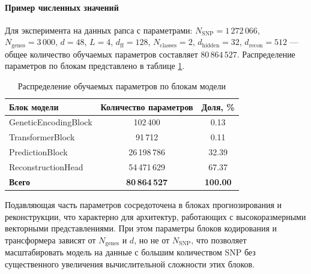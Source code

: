 \paragraph{Пример численных значений}

Для эксперимента на данных рапса с параметрами: $N_{\text{SNP}} = 1\,272\,066$, 
$N_{\text{genes}} = 3\,000$, $d = 48$, $L = 4$, $d_{\text{ff}} = 128$, 
$N_{\text{classes}} = 2$, $d_{\text{hidden}} = 32$, $d_{\text{recon}} = 512$ ---
общее количество обучаемых параметров составляет $80\,864\,527$. 
Распределение параметров по блокам представлено в таблице \ref{tab:params_distribution}.

\begin{table}[h!]
	\centering
	\caption{Распределение обучаемых параметров по блокам модели}
	\label{tab:params_distribution}
	\begin{tabular}{|l|c|c|}
		\hline
		\textbf{Блок модели} & \textbf{Количество параметров} & \textbf{Доля, \%} \\ \hline
		GeneticEncodingBlock & 102\,400 & 0.13 \\ \hline
		TransformerBlock & 91\,712 & 0.11 \\ \hline
		PredictionBlock & 26\,198\,786 & 32.39 \\ \hline
		ReconstructionHead & 54\,471\,629 & 67.37 \\ \hline
		\textbf{Всего} & \textbf{80\,864\,527} & \textbf{100.00} \\ \hline
	\end{tabular}
\end{table}

Подавляющая часть параметров сосредоточена в блоках прогнозирования и 
реконструкции, что характерно для архитектур, работающих с высокоразмерными 
векторными представлениями. При этом параметры блоков кодирования и 
трансформера зависят от $N_{\text{genes}}$ и $d$, но не от $N_{\text{SNP}}$, 
что позволяет масштабировать модель на данные с большим количеством SNP 
без существенного увеличения вычислительной сложности этих блоков.








